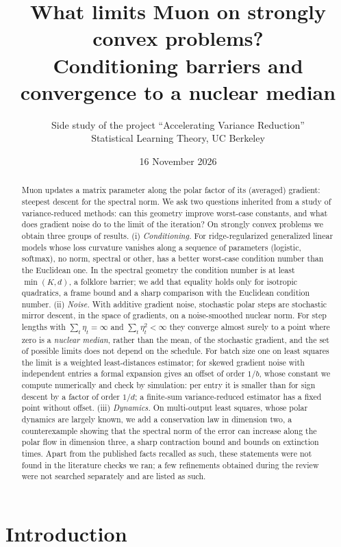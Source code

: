 \documentclass[11pt]{article}
\title{What limits Muon on strongly convex problems?\\ Conditioning barriers and convergence to a nuclear median}
\author{Side study of the project ``Accelerating Variance Reduction''\\ Statistical Learning Theory, UC Berkeley}
\date{16 November 2026}
\theoremstyle{remark}
\begin{document}
\maketitle

\begin{abstract}
Muon updates a matrix parameter along the polar factor of its (averaged) gradient: steepest descent for the spectral
norm. We ask two questions inherited from a study of variance-reduced methods: can this geometry improve worst-case
constants, and what does gradient noise do to the limit of the iteration? On strongly convex problems we obtain three
groups of results. (i) \emph{Conditioning.} For ridge-regularized generalized linear models whose loss curvature
vanishes along a sequence of parameters (logistic, softmax), no norm, spectral or other, has a better worst-case
condition number than the Euclidean one. In the spectral geometry the condition number is at least $\min(K,d)$, a
folklore barrier; we add that equality holds only for isotropic quadratics, a frame bound and a sharp comparison with
the Euclidean condition number. (ii) \emph{Noise.} With additive gradient noise, stochastic polar steps are stochastic
mirror descent, in the space of gradients, on a noise-smoothed nuclear norm. For step lengths with
$\sum_t\eta_t=\infty$ and $\sum_t\eta_t^2<\infty$ they converge almost surely to a point where zero is a \emph{nuclear
median}, rather than the mean, of the stochastic gradient, and the set of possible limits does not depend on the
schedule. For batch size one on least squares the limit is a weighted least-distances estimator; for skewed gradient
noise with independent entries a formal expansion gives an offset of order $1/b$, whose constant we compute numerically
and check by simulation: per entry it is smaller than for sign descent by a factor of order $1/d$; a finite-sum
variance-reduced estimator has a fixed point without offset. (iii) \emph{Dynamics.} On multi-output least squares,
whose polar dynamics are largely known, we add a conservation law in dimension two, a counterexample showing that the
spectral norm of the error can increase along the polar flow in dimension three, a sharp contraction bound and bounds
on extinction times. Apart from the published facts recalled as such, these statements were not found in the
literature checks we ran; a few refinements obtained during the review were not searched separately and are listed as
such.
\end{abstract}

\section{Introduction}
\end{document}
